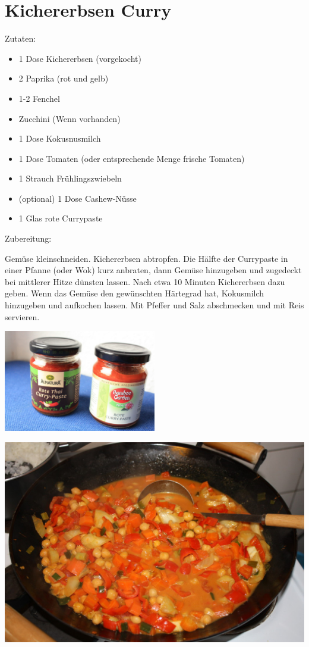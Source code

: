 \section{Kichererbsen Curry}
Zutaten:
\begin{itemize}
    \item 1 Dose Kichererbsen (vorgekocht)
    \item 2 Paprika (rot und gelb)
    \item 1-2 Fenchel
    \item Zucchini (Wenn vorhanden)
    \item 1 Dose Kokusnusmilch
    \item 1 Dose Tomaten (oder entsprechende Menge frische Tomaten)
    \item 1 Strauch Frühlingszwiebeln
    \item (optional) 1 Dose Cashew-Nüsse
    \item 1 Glas rote Currypaste
\end{itemize}

\vspace{1cm}

\noindent Zubereitung:

\noindent Gemüse kleinschneiden. Kichererbsen abtropfen. Die Hälfte der
Currypaste in einer Pfanne (oder Wok) kurz anbraten, dann Gemüse hinzugeben und
zugedeckt bei mittlerer Hitze dünsten lassen. Nach etwa 10 Minuten Kichererbsen
dazu geben. Wenn das Gemüse den gewünschten Härtegrad hat, Kokusmilch
hinzugeben und aufkochen lassen. Mit Pfeffer und Salz abschmecken und mit Reis
servieren.

\newpage
\mbox{}
\vfill
\begin{center}
    \includegraphics[width=0.5\textwidth]{Kichererbsen-Curry/IMG_6111._small.jpg}
\end{center}
\vfill
\begin{center}
    \includegraphics[width=\textwidth]{Kichererbsen-Curry/IMG_6085._small.jpg}
\end{center}
\vfill
\mbox{ }
\newpage
